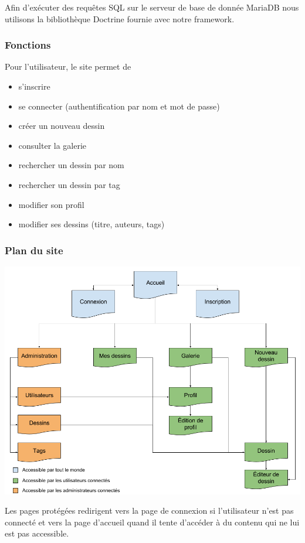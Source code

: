 \documentclass[a4paper]{article}
\begin{document}
Afin d'exécuter des requêtes SQL sur le serveur de base de donnée MariaDB nous utilisons la bibliothèque Doctrine fournie avec notre framework.

\subsubsection{Fonctions}
Pour l'utilisateur, le site permet de
\begin{itemize}
	\item s'inscrire
	\item se connecter (authentification par nom et mot de passe)
	\item créer un nouveau dessin
	\item consulter la galerie
	\item rechercher un dessin par nom
	\item rechercher un dessin par tag
	\item modifier son profil
	\item modifier ses dessins (titre, auteurs, tags)
\end{itemize}

\subsubsection{Plan du site}
\begin{center}
	\includegraphics[width=1\textwidth]{sketcher_sitemap.png}
\end{center}

\vspace{10 mm}
Les pages protégées redirigent vers la page de connexion si l'utilisateur n'est pas connecté et vers la page d'accueil quand il tente d'accéder à du contenu qui ne lui est pas accessible.
\end{document}
